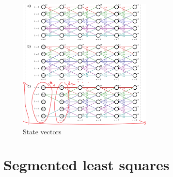 \begin{figure}[htpb]
  \centering
  \includegraphics[width=0.6\textwidth]{Figures/state_vectors}
  \caption{State vectors}
\end{figure}

\section{Segmented least squares}

